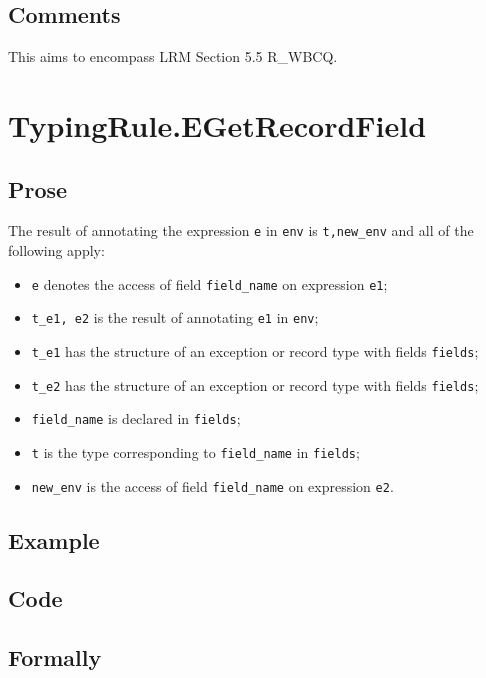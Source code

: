 \documentclass{book}
\begin{document}
\subsection{Comments}
  This aims to encompass LRM Section 5.5 R\_WBCQ.


\section{TypingRule.EGetRecordField \label{sec:TypingRule.EGetRecordField}}

  \subsection{Prose}
  The result of annotating the expression \texttt{e} in \texttt{env} is
\texttt{t,new\_env} and all of the following apply:
  \begin{itemize}
  \item \texttt{e} denotes the access of field \texttt{field\_name} on expression \texttt{e1};
  \item \texttt{t\_e1, e2} is the result of annotating \texttt{e1} in \texttt{env};
  \item \texttt{t\_e1} has the structure of an exception or record type with fields \texttt{fields};
  \item \texttt{t\_e2} has the structure of an exception or record type with fields \texttt{fields};
  \item \texttt{field\_name} is declared in \texttt{fields};
  \item \texttt{t} is the type corresponding to \texttt{field\_name} in \texttt{fields};
  \item \texttt{new\_env} is the access of field \texttt{field\_name} on expression \texttt{e2}.
  \end{itemize}

  \subsection{Example}

  \subsection{Code}

\begin{emptyformal}
    \subsection{Formally}
\end{emptyformal}
\end{document}
